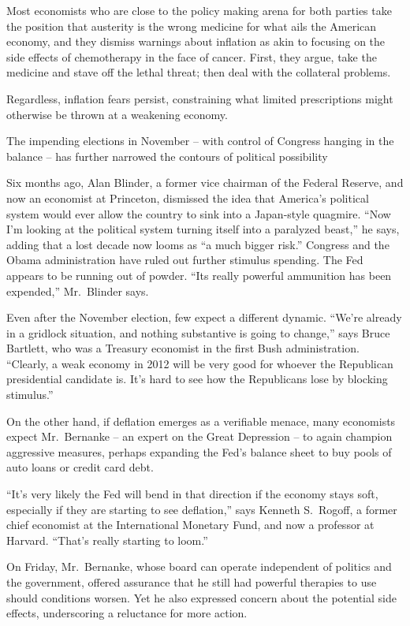 ﻿\documentclass[12pt]{article}
\begin{document}
Most economists who are close to the policy making arena for both parties take the position that
austerity is the wrong medicine for what ails the American economy, and they dismiss warnings about
inflation as akin to focusing on the side effects of chemotherapy in the face of cancer. First, they
argue, take the medicine and stave off the lethal threat; then deal with the collateral problems.

Regardless, inflation fears persist, constraining what limited prescriptions might otherwise be
thrown at a weakening economy.

The impending elections in November -- with control of Congress hanging in the balance -- has
further narrowed the contours of political possibility

Six months ago, Alan Blinder, a former vice chairman of the Federal Reserve, and now an economist at
Princeton, dismissed the idea that America's political system would ever allow the country to sink
into a Japan-style quagmire. ``Now I'm looking at the political system turning itself into a
paralyzed beast,'' he says, adding that a lost decade now looms as ``a much bigger risk.'' Congress
and the Obama administration have ruled out further stimulus spending. The Fed appears to be running
out of powder. ``Its really powerful ammunition has been expended,'' Mr.~Blinder says.

Even after the November election, few expect a different dynamic. ``We're already in a gridlock
situation, and nothing substantive is going to change,'' says Bruce Bartlett, who was a Treasury
economist in the first Bush administration. ``Clearly, a weak economy in 2012 will be very good for
whoever the Republican presidential candidate is. It's hard to see how the Republicans lose by
blocking stimulus.''

On the other hand, if deflation emerges as a verifiable menace, many economists expect Mr.~Bernanke
-- an expert on the Great Depression -- to again champion aggressive measures, perhaps expanding the
Fed's balance sheet to buy pools of auto loans or credit card debt.

``It's very likely the Fed will bend in that direction if the economy stays soft, especially if they
are starting to see deflation,'' says Kenneth S.~Rogoff, a former chief economist at the
International Monetary Fund, and now a professor at Harvard. ``That's really starting to loom.''

On Friday, Mr.~Bernanke, whose board can operate independent of politics and the government, offered
assurance that he still had powerful therapies to use should conditions worsen. Yet he also
expressed concern about the potential side effects, underscoring a reluctance for more action.
\end{document}
